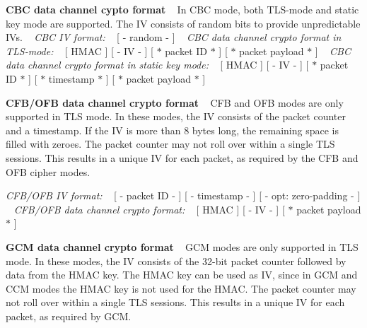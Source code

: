 \begin{DoxyParagraph}{}
{\bfseries C\+B\+C data channel cypto format} ~\newline
In C\+B\+C mode, both T\+L\+S-\/mode and static key mode are supported. The I\+V consists of random bits to provide unpredictable I\+Vs. ~\newline
{\itshape C\+B\+C I\+V format\+:} ~\newline
{\ttfamily  \mbox{[} -\/ random -\/ \mbox{]} } ~\newline
{\itshape C\+B\+C data channel crypto format in T\+L\+S-\/mode\+:} ~\newline
{\ttfamily  \mbox{[} H\+M\+A\+C \mbox{]} \mbox{[} -\/ I\+V -\/ \mbox{]} \mbox{[} $\ast$ packet I\+D $\ast$ \mbox{]} \mbox{[} $\ast$ packet payload $\ast$ \mbox{]} } ~\newline
{\itshape C\+B\+C data channel crypto format in static key mode\+:} ~\newline
{\ttfamily  \mbox{[} H\+M\+A\+C \mbox{]} \mbox{[} -\/ I\+V -\/ \mbox{]} \mbox{[} $\ast$ packet I\+D $\ast$ \mbox{]} \mbox{[} $\ast$ timestamp $\ast$ \mbox{]} \mbox{[} $\ast$ packet payload $\ast$ \mbox{]} }
\end{DoxyParagraph}
\begin{DoxyParagraph}{}
{\bfseries C\+F\+B/\+O\+F\+B data channel crypto format} ~\newline
C\+F\+B and O\+F\+B modes are only supported in T\+L\+S mode. In these modes, the I\+V consists of the packet counter and a timestamp. If the I\+V is more than 8 bytes long, the remaining space is filled with zeroes. The packet counter may not roll over within a single T\+L\+S sessions. This results in a unique I\+V for each packet, as required by the C\+F\+B and O\+F\+B cipher modes.
\end{DoxyParagraph}
\begin{DoxyParagraph}{}
{\itshape C\+F\+B/\+O\+F\+B I\+V format\+:} ~\newline
{\ttfamily  \mbox{[} -\/ packet I\+D -\/ \mbox{]} \mbox{[} -\/ timestamp -\/ \mbox{]} \mbox{[} -\/ opt\+: zero-\/padding -\/ \mbox{]} }~\newline
{\itshape C\+F\+B/\+O\+F\+B data channel crypto format\+:} ~\newline
{\ttfamily  \mbox{[} H\+M\+A\+C \mbox{]} \mbox{[} -\/ I\+V -\/ \mbox{]} \mbox{[} $\ast$ packet payload $\ast$ \mbox{]} }
\end{DoxyParagraph}
\begin{DoxyParagraph}{}
{\bfseries G\+C\+M data channel crypto format} ~\newline
G\+C\+M modes are only supported in T\+L\+S mode. In these modes, the I\+V consists of the 32-\/bit packet counter followed by data from the H\+M\+A\+C key. The H\+M\+A\+C key can be used as I\+V, since in G\+C\+M and C\+C\+M modes the H\+M\+A\+C key is not used for the H\+M\+A\+C. The packet counter may not roll over within a single T\+L\+S sessions. This results in a unique I\+V for each packet, as required by G\+C\+M.
\end{DoxyParagraph}
